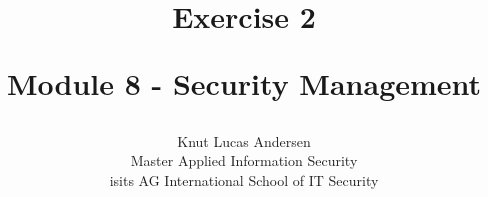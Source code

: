 \title{ 
	\begin{center} \textbf{ Exercise 2 } \end{center}
	\begin{center} {\large Module 8 - Security Management } \end{center}
}

\author{ 
	Knut Lucas Andersen \\
	Master Applied Information Security \\
	isits AG International School of IT Security
}